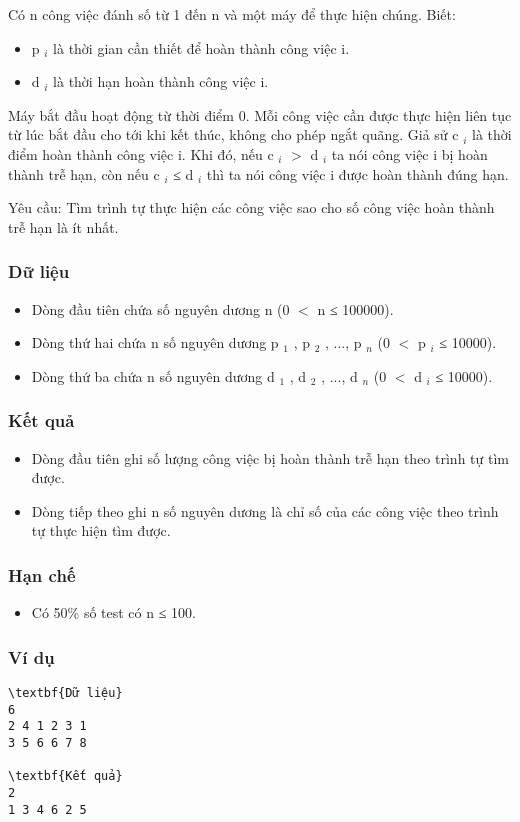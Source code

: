 



   Có n công việc đánh số từ 1 đến n và một máy để thực hiện chúng. Biết:  
\begin{itemize}
	\item     p    $_     i    $    là thời gian cần thiết để hoàn thành công việc i.   
	\item     d    $_     i    $    là thời hạn hoàn thành công việc i.   
\end{itemize}

   Máy bắt đầu hoạt động từ thời điểm 0. Mỗi công việc cần được thực hiện liên tục từ lúc bắt đầu cho tới khi kết thúc, không cho phép ngắt quãng. Giả sử c   $_    i   $   là thời điểm hoàn thành công việc i. Khi đó, nếu c   $_    i   $   $>$  d   $_    i   $   ta nói công việc i bị hoàn thành trễ hạn, còn nếu  c   $_    i   $   ≤ d   $_    i   $   thì ta nói công việc i được hoàn thành đúng hạn.  

   Yêu cầu: Tìm trình tự thực hiện các công việc sao cho số công việc hoàn thành trễ hạn là ít nhất.  

\subsubsection{   Dữ liệu  }
\begin{itemize}
	\item     Dòng đầu tiên chứa số nguyên dương n (0 $<$ n ≤ 100000).   
	\item     Dòng thứ hai chứa n số nguyên dương p    $_     1    $    , p    $_     2    $    , ..., p    $_     n    $    (0 $<$ p    $_     i    $    ≤ 10000).   
	\item     Dòng thứ ba chứa n số nguyên dương d    $_     1    $    , d    $_     2    $    , ..., d    $_     n    $    (0 $<$ d    $_     i    $    ≤ 10000).   
\end{itemize}

\subsubsection{   Kết quả  }
\begin{itemize}
	\item     Dòng đầu tiên ghi số lượng công việc bị hoàn thành trễ hạn theo trình tự tìm được.   
	\item     Dòng tiếp theo ghi n số nguyên dương là chỉ số của các công việc theo trình tự thực hiện tìm được.   
\end{itemize}

\subsubsection{   Hạn chế  }
\begin{itemize}
	\item     Có 50\% số test có n ≤ 100.   
\end{itemize}

\subsubsection{   Ví dụ  }
\begin{verbatim}
\textbf{Dữ liệu}
6
2 4 1 2 3 1
3 5 6 6 7 8

\textbf{Kết quả}
2
1 3 4 6 2 5
\end{verbatim}